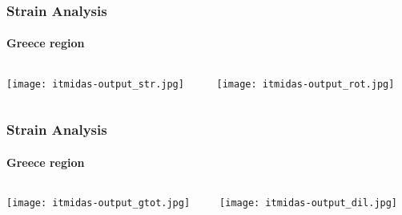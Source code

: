 \begin{frame}
 \frametitle{Strain Analysis}
 \framesubtitle{Greece region}
 \label{ch4:}
   
  \begin{columns}
    \begin{column}{0.5\textwidth}
      
      \texttt{[image: itmidas-output\_str.jpg]}   
    \end{column}
    \begin{column}{0.5\textwidth}
    \begin{center}
      
      \texttt{[image: itmidas-output\_rot.jpg]}     
    \end{center}
    \end{column}
  \end{columns}

\end{frame}
\note{}

\begin{frame}
 \frametitle{Strain Analysis}
 \framesubtitle{Greece region}
 \label{ch4:}
   
  \begin{columns}
    \begin{column}{0.5\textwidth}
      \texttt{[image: itmidas-output\_gtot.jpg]}   
    \end{column}
    \begin{column}{0.5\textwidth}
    \begin{center}
      \texttt{[image: itmidas-output\_dil.jpg]}     
    \end{center}
    \end{column}
  
  \end{columns}

\end{frame}
\note{}




